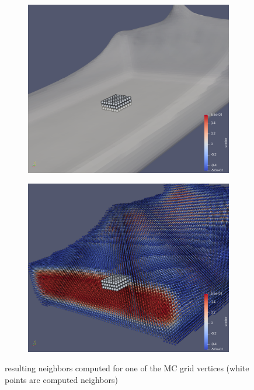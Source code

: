 \begin{figure}[H]
    \begin{subfigure}[b]{0.5\textwidth}
           \includegraphics[width=\textwidth]{figures/NeighborsComputation.png}
    \end{subfigure}
    \begin{subfigure}[b]{0.5\textwidth}
           \includegraphics[width=\textwidth]{figures/NeighborsComputation2.png}
    \end{subfigure}

    \caption{resulting neighbors computed for one of the MC grid vertices (white points are computed neighbors)}
    \label{fig:nghbrs_computation}
\end{figure}
